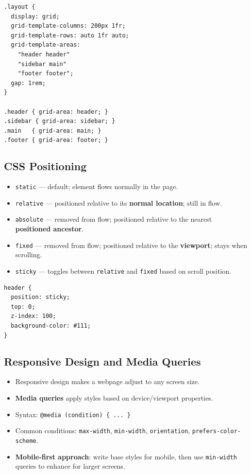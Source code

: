 \documentclass[hidelinks]{article}
\begin{document}
\begin{lstlisting}[language={}, caption={CSS Grid layout example}]
.layout {
  display: grid;
  grid-template-columns: 200px 1fr;
  grid-template-rows: auto 1fr auto;
  grid-template-areas:
    "header header"
    "sidebar main"
    "footer footer";
  gap: 1rem;
}

.header { grid-area: header; }
.sidebar { grid-area: sidebar; }
.main   { grid-area: main; }
.footer { grid-area: footer; }
\end{lstlisting}

\subsection{CSS Positioning}
\begin{itemize}
  \item \texttt{static} --- default; element flows normally in the page.
  \item \texttt{relative} --- positioned relative to its \textbf{normal location}; still in flow.
  \item \texttt{absolute} --- removed from flow; positioned relative to the nearest \textbf{positioned ancestor}.
  \item \texttt{fixed} --- removed from flow; positioned relative to the \textbf{viewport}; stays when scrolling.
  \item \texttt{sticky} --- toggles between \texttt{relative} and \texttt{fixed} based on scroll position.
\end{itemize}

\begin{lstlisting}[language={}, caption={Sticky header example}]
header {
  position: sticky;
  top: 0;
  z-index: 100;
  background-color: #111;
}
\end{lstlisting}

\subsection{Responsive Design and Media Queries}
\begin{itemize}
  \item Responsive design makes a webpage adjust to any screen size.
  \item \textbf{Media queries} apply styles based on device/viewport properties.
  \item Syntax: \texttt{@media (condition) \{ ... \}}
  \item Common conditions: \texttt{max-width}, \texttt{min-width}, \texttt{orientation}, \texttt{prefers-color-scheme}.
  \item \textbf{Mobile-first approach}: write base styles for mobile, then use \texttt{min-width} queries to enhance for larger screens.
\end{itemize}
\end{document}
